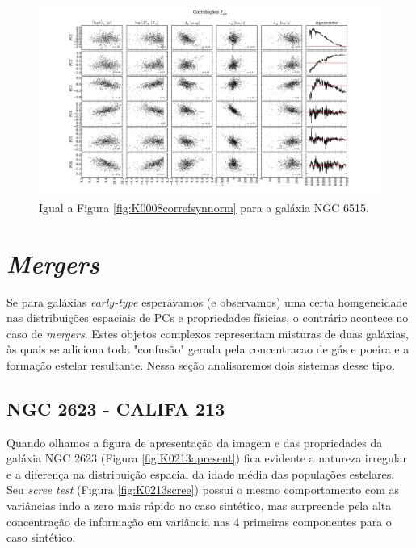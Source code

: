\begin{figure}
    \includegraphics[width=1.2\textwidth, angle=-90]{figuras/K0864-correl-f_syn_norm-PCvsPhys.pdf}
	\caption[Correlações PCs vs. par\^ametros f\'isicos - $f_{syn}$ - NGC 6515.]
	{Igual a Figura \ref{fig:K0008correfsynnorm} para a galáxia NGC 6515.}
    \label{fig:K0864correfsynnorm}
\end{figure}

\section{{\em Mergers}}
\label{sec:result:mergers}

Se para galáxias {\em early-type} esperávamos (e observamos) uma certa homgeneidade nas distribuições espaciais de PCs e
propriedades físicias, o contrário acontece no caso de {\em mergers}. Estes objetos complexos representam misturas de
duas galáxias, às quais se adiciona toda "confusão" gerada pela concentracao de gás e poeira e a formação estelar
resultante. Nessa seção analisaremos dois sistemas desse tipo.

\subsection{NGC 2623 - CALIFA 213}

Quando olhamos a figura de apresentação da imagem e das propriedades da galáxia NGC 2623 (Figura
\ref{fig:K0213apresent}) fica evidente a natureza irregular e a diferença na distribuição espacial da idade média das
populações estelares. Seu {\em scree test} (Figura \ref{fig:K0213scree}) possui o mesmo comportamento com as variâncias
indo a zero mais rápido no caso sintético, mas surpreende pela alta concentração de informação em variância nas 4
primeiras componentes para o caso sintético.

